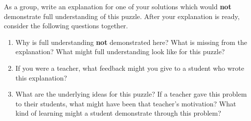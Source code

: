 \documentclass {ximera}
\begin{document}
\begin{problem} 
As a group, write an explanation for one of your solutions which would {\bf not} demonstrate full understanding of this puzzle. After your explanation is ready, consider the following questions together.
\begin{enumerate}
	\item Why is full understanding {\bf not} demonstrated here? What is missing from the explanation? What might full understanding look like for this puzzle?
	\item If you were a teacher, what feedback might you give to a student who wrote this explanation? 
	\item What are the underlying ideas for this puzzle? If a teacher gave this problem to their students, what might have been that teacher's motivation? What kind of learning might a student demonstrate through this problem?
\end{enumerate}
\end{problem}


\newpage
\end{document}
